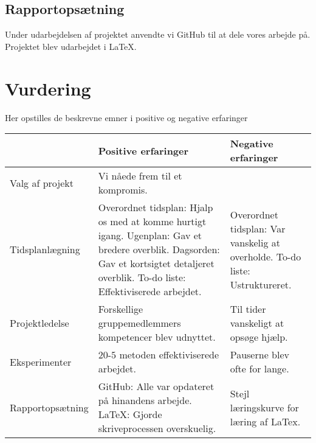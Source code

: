 \subsection{Rapportopsætning}
Under udarbejdelsen af projektet anvendte vi GitHub til at dele vores arbejde på. Projektet blev udarbejdet i LaTeX. 

\section{Vurdering}
Her opstilles de beskrevne emner i positive og negative erfaringer


\begin{table}[h]
	\begin{tabular}{|l|p{5cm}|p{5cm}|}
		\hline
		&\textbf{Positive erfaringer}&\textbf{Negative erfaringer}\\ \hline
		Valg af projekt  & Vi nåede frem til et kompromis.& \\ \hline  
		Tidsplanlægning  & Overordnet tidsplan: Hjalp os med at komme hurtigt igang.\newline
		Ugenplan: Gav et bredere overblik.\newline
		Dagsorden: Gav et kortsigtet detaljeret overblik.\newline
		To-do liste: Effektiviserede arbejdet. & Overordnet tidsplan: Var vanskelig at overholde. \newline 
		To-do liste: Ustruktureret. \\ \hline
		Projektledelse   & Forskellige gruppemedlemmers kompetencer blev udnyttet. & Til tider vanskeligt at opsøge hjælp. \\ \hline
		Eksperimenter    & $20$-$5$ metoden effektiviserede arbejdet. & Pauserne blev ofte for lange. \\ \hline
		Rapportopsætning & GitHub: Alle var opdateret på hinandens arbejde.\newline
		LaTeX: Gjorde skriveprocessen overskuelig. & Stejl læringskurve for læring af LaTex.\\ \hline
     
	\end{tabular}
\end{table}



